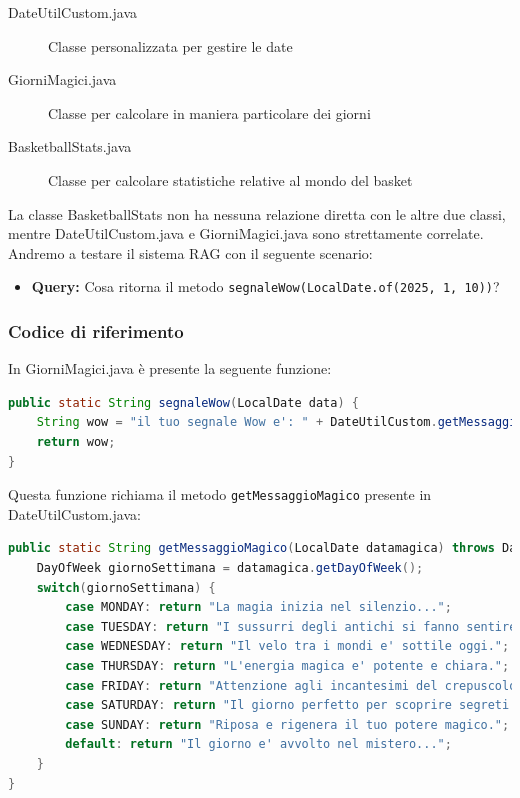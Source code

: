 \documentclass[12pt,a4paper,openright,twoside]{book}
\begin{document}
\begin{description}
    \item[DateUtilCustom.java] Classe personalizzata per gestire le date
    \item[GiorniMagici.java] Classe per calcolare in maniera particolare dei giorni
    \item[BasketballStats.java] Classe per calcolare statistiche relative al mondo del basket
\end{description}

La classe BasketballStats non ha nessuna relazione diretta con le altre due classi, mentre DateUtilCustom.java e GiorniMagici.java sono strettamente correlate.
Andremo a testare il sistema RAG con il seguente scenario:

\begin{itemize}
    \item \textbf{Query:} Cosa ritorna il metodo \texttt{segnaleWow(LocalDate.of(2025, 1, 10))}?
\end{itemize}

\subsubsection{Codice di riferimento}
In GiorniMagici.java è presente la seguente funzione:

\begin{lstlisting}[language=Java, caption={Metodo segnaleWow in GiorniMagici.java}, label={lst:segnaleWow}]
public static String segnaleWow(LocalDate data) {
    String wow = "il tuo segnale Wow e': " + DateUtilCustom.getMessaggioMagico(date);
    return wow;
}
\end{lstlisting}

Questa funzione richiama il metodo \texttt{getMessaggioMagico} presente in DateUtilCustom.java:

\begin{lstlisting}[language=Java, caption={Metodo getMessaggioMagico in DateUtilCustom.java}, label={lst:getMessaggioMagico}]
public static String getMessaggioMagico(LocalDate datamagica) throws DateTimeParseException {
    DayOfWeek giornoSettimana = datamagica.getDayOfWeek();
    switch(giornoSettimana) {
        case MONDAY: return "La magia inizia nel silenzio...";
        case TUESDAY: return "I sussurri degli antichi si fanno sentire.";
        case WEDNESDAY: return "Il velo tra i mondi e' sottile oggi.";
        case THURSDAY: return "L'energia magica e' potente e chiara.";
        case FRIDAY: return "Attenzione agli incantesimi del crepuscolo.";
        case SATURDAY: return "Il giorno perfetto per scoprire segreti nascosti.";
        case SUNDAY: return "Riposa e rigenera il tuo potere magico.";
        default: return "Il giorno e' avvolto nel mistero...";
    }
}
\end{lstlisting}
\end{document}
